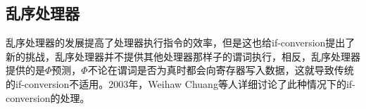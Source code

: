 \subsection{乱序处理器}

乱序处理器的发展提高了处理器执行指令的效率，但是这也给if-conversion提出了新的挑战，乱序处理器并不提供其他处理器那样子的谓词执行，相反，乱序处理器提供的是$\Phi$预测，$\Phi$不论在谓词是否为真时都会向寄存器写入数据，这就导致传统的if-conversion不适用。2003年，Weihaw Chuang等人详细讨论了此种情况下的if-conversion的处理\cite{Chuang}。